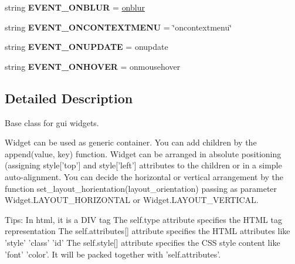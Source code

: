 \begin{DoxyCompactItemize}
\item 
string {\bfseries E\+V\+E\+N\+T\+\_\+\+O\+N\+B\+L\+UR} = \textquotesingle{}\hyperlink{classremi_1_1gui_1_1Widget_ae0882945f8fb3fc4ce42203fe2e9a6c4}{onblur}\textquotesingle{}\hypertarget{classremi_1_1gui_1_1Widget_aaa52f032e204443b509f748d88a3f29d}{}\label{classremi_1_1gui_1_1Widget_aaa52f032e204443b509f748d88a3f29d}

\item 
string {\bfseries E\+V\+E\+N\+T\+\_\+\+O\+N\+C\+O\+N\+T\+E\+X\+T\+M\+E\+NU} = \char`\"{}oncontextmenu\char`\"{}\hypertarget{classremi_1_1gui_1_1Widget_ae1e82c70192a2cddb2280fb7049b999c}{}\label{classremi_1_1gui_1_1Widget_ae1e82c70192a2cddb2280fb7049b999c}

\item 
string {\bfseries E\+V\+E\+N\+T\+\_\+\+O\+N\+U\+P\+D\+A\+TE} = \textquotesingle{}onupdate\textquotesingle{}\hypertarget{classremi_1_1gui_1_1Widget_ad87b7c648f1423ab418d1695b9e6c435}{}\label{classremi_1_1gui_1_1Widget_ad87b7c648f1423ab418d1695b9e6c435}

\item 
string {\bfseries E\+V\+E\+N\+T\+\_\+\+O\+N\+H\+O\+V\+ER} = \textquotesingle{}onmousehover\textquotesingle{}\hypertarget{classremi_1_1gui_1_1Widget_ad7578270ce541c36db746eae1014fc02}{}\label{classremi_1_1gui_1_1Widget_ad7578270ce541c36db746eae1014fc02}

\end{DoxyCompactItemize}


\subsection{Detailed Description}
\begin{DoxyVerb}Base class for gui widgets.

Widget can be used as generic container. You can add children by the append(value, key) function.
Widget can be arranged in absolute positioning (assigning style['top'] and style['left'] attributes to the children
or in a simple auto-alignment.
You can decide the horizontal or vertical arrangement by the function set_layout_horientation(layout_orientation)
passing as parameter Widget.LAYOUT_HORIZONTAL or Widget.LAYOUT_VERTICAL.

Tips:
In html, it is a DIV tag
The self.type attribute specifies the HTML tag representation
The self.attributes[] attribute specifies the HTML attributes like 'style' 'class' 'id'
The self.style[] attribute specifies the CSS style content like 'font' 'color'. It will be packed together with
'self.attributes'.
\end{DoxyVerb}
 


